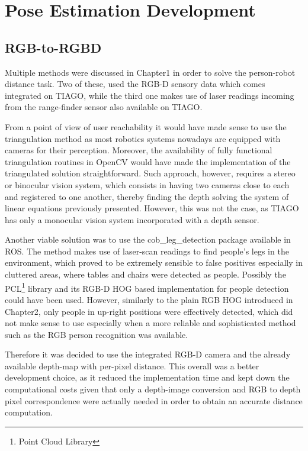 \chapter{Pose Estimation Development}
\label{chapter4}

\section{RGB-to-RGBD}

Multiple methods were discussed in Chapter1 in order to solve the person-robot distance task. Two of these, used the RGB-D sensory data which comes integrated on TIAGO, while the third one makes use of laser readings incoming from the range-finder sensor also available on TIAGO.

From a point of view of user reachability it would have made sense to use the triangulation method as most robotics systems nowadays are equipped with cameras for their perception. Moreover, the availability of fully functional triangulation routines in OpenCV would have made the implementation of the triangulated solution straightforward. Such approach, however, requires a stereo or binocular vision system, which consists in having two cameras close to each and registered to one another, thereby finding the depth solving the system of linear equations previously presented. However, this was not the case, as TIAGO has only a monocular vision system incorporated with a depth sensor.

Another viable solution was to use the cob\_leg\_detection \cite{website:cobLegDetection} package available in ROS. The method makes use of laser-scan readings to find people's legs in the environment, which proved to be extremely sensible to false positives especially in cluttered areas, where tables and chairs were detected as people. Possibly the PCL\footnote{Point Cloud Library} library and its RGB-D HOG based implementation for people detection \cite{munaro2014fast} could have been used. However, similarly to the plain RGB HOG introduced in Chapter2, only people in up-right positions were effectively detected, which did not make sense to use especially when a more reliable and sophisticated method such as the RGB person recognition was available.

Therefore it was decided to use the integrated RGB-D camera and the already available depth-map with per-pixel distance. This overall was a better development choice, as it reduced the implementation time and kept down the computational costs given that only a depth-image conversion and RGB to depth pixel correspondence were actually needed in order to obtain an accurate distance computation.

